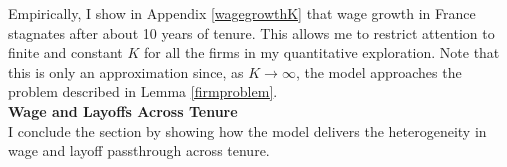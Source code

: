 Empirically, I show in Appendix \ref{wagegrowthK} that wage growth in France stagnates after about 10 years of tenure.  This allows me to restrict attention to finite and constant $K$ for all the firms in my quantitative exploration. Note that this is only an approximation since, as $K\rightarrow\infty$, the model approaches the problem described in Lemma \ref{firmproblem}. \\
\textbf{Wage and Layoffs Across Tenure} \\
I conclude the section by showing how the model delivers the heterogeneity in wage and layoff passthrough across tenure. 

